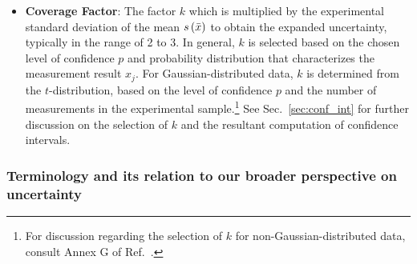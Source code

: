 \begin{itemize}
\item {\bf Coverage Factor}:
  The factor $k$ which is multiplied by the experimental standard deviation of the mean \hyperref[def:exp_st_dev_mean]{$s\left( \bar{x} \right)$} to obtain the expanded uncertainty, typically in the range of 2 to 3. In general, $k$ is selected based on the chosen level of confidence $p$ and probability distribution that characterizes the measurement result $x_j$. For Gaussian-distributed data, $k$ is determined from the $t$-distribution, based on the level of confidence $p$ and the number of measurements in the experimental sample.\footnote{For discussion regarding the selection of $k$ for non-Gaussian-distributed data, consult Annex G of Ref.~\cite{JCGM:GUM2008}.} See Sec.~\ref{sec:conf_int} for further discussion on the selection of $k$ and the resultant computation of confidence intervals.
  \label{def:coveragefactor}
  
\end{itemize}





\subsubsection{Terminology and its relation to our broader perspective on uncertainty}

